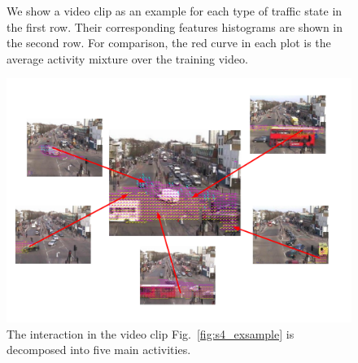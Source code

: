 \begin{figure}[!htbp]
{\begin{minipage}{0.45\linewidth}
		\end{minipage}
		\label{fig:s8_exsample}
	}
	\caption[Examples of online classification in QMUL Junction Dataset]
	{We show a video clip as an example for each type of traffic state in the first row. Their corresponding features histograms are shown in the second row. For comparison, the red curve in each plot is the average activity mixture over the training video.}
	\label{fig:online_exsample_qmul}
\end{figure}

\clearpage
\newpage
\begin{landscape}
	\begin{figure}[!htbp]
		\centering
		\includegraphics[width = 20cm]{figures/qmul/construct_example_699_new.pdf}
		\caption[Decomposition of an interaction into main activities]
		{The interaction in the video clip Fig.~\ref{fig:s4_exsample} is decomposed into five main activities.}
		\label{fig:qmul:interaction_decomposition}
	\end{figure}
\end{landscape}

